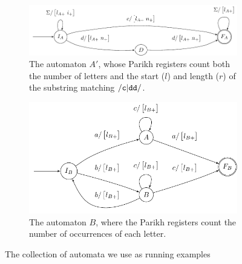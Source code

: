 \begin{figure}[h]
    \centering 
  \begin{subfigure}[b]{0.5\textwidth}
    \centering
    \includegraphics[scale=\autscale]{a}
    \caption{The automaton $A'$, whose Parikh registers count both the number of letters and the start ($l$) and length ($r$) of the substring matching $\mathtt{\slash c\vert{}dd\slash}$.}\label{fig:aut_a}
  \end{subfigure}
  \begin{subfigure}[b]{0.5\textwidth}
    \centering
    \includegraphics[scale=\autscale]{b}
    \caption{The automaton $B$, where the Parikh registers count the number of occurrences of each letter.}\label{fig:aut_b}
  \end{subfigure}
  \caption{The collection of automata we use as running examples}\label{fig:examples}
\end{figure}


